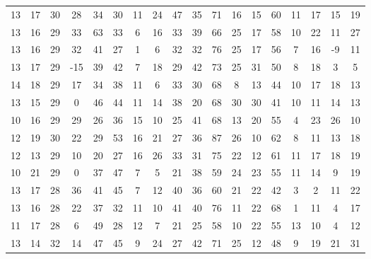 \begin{sidewaystable}
\begin{tabular}{cccccccccccccccccc}
    13    & 17    & 30    & 28    & 34    & 30    & 11    & 24    & 47    & 35     & 71     & 16     & 15     & 60     & 11     & 17     & 15     & 19     \\
    13    & 16    & 29    & 33    & 63    & 33    & 6     & 16    & 33    & 39     & 66     & 25     & 17     & 58     & 10     & 22     & 11     & 27     \\
    13    & 16    & 29    & 32    & 41    & 27    & 1     & 6     & 32    & 32     & 76     & 25     & 17     & 56     & 7      & 16     & -9     & 11     \\
    13    & 17    & 29    & -15   & 39    & 42    & 7     & 18    & 29    & 42     & 73     & 25     & 31     & 50     & 8      & 18     & 3      & 5      \\
    14    & 18    & 29    & 17    & 34    & 38    & 11    & 6     & 33    & 30     & 68     & 8      & 13     & 44     & 10     & 17     & 18     & 13     \\
    13    & 15    & 29    & 0     & 46    & 44    & 11    & 14    & 38    & 20     & 68     & 30     & 30     & 41     & 10     & 11     & 14     & 13     \\
    10    & 16    & 29    & 29    & 26    & 36    & 15    & 10    & 25    & 41     & 68     & 13     & 20     & 55     & 4      & 23     & 26     & 10     \\
    12    & 19    & 30    & 22    & 29    & 53    & 16    & 21    & 27    & 36     & 87     & 26     & 10     & 62     & 8      & 11     & 13     & 18     \\
    12    & 13    & 29    & 10    & 20    & 27    & 16    & 26    & 33    & 31     & 75     & 22     & 12     & 61     & 11     & 17     & 18     & 19     \\
    10    & 21    & 29    & 0     & 37    & 47    & 7     & 5     & 21    & 38     & 59     & 24     & 23     & 55     & 11     & 14     & 9      & 19     \\
    13    & 17    & 28    & 36    & 41    & 45    & 7     & 12    & 40    & 36     & 60     & 21     & 22     & 42     & 3      & 2      & 11     & 22     \\
    13    & 16    & 28    & 22    & 37    & 32    & 11    & 10    & 41    & 40     & 76     & 11     & 22     & 68     & 1      & 11     & 4      & 17     \\
    11    & 17    & 28    & 6     & 49    & 28    & 12    & 7     & 21    & 25     & 58     & 10     & 22     & 55     & 13     & 10     & 4      & 12     \\
    13    & 14    & 32    & 14    & 47    & 45    & 9     & 24    & 27    & 42     & 71     & 25     & 12     & 48     & 9      & 19     & 21     & 31     \\

\end{tabular}
\end{sidewaystable}
